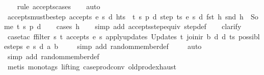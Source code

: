\begin{isabellebody}
%
\isadelimproof
\ \ %
\endisadelimproof
%
\isatagproof
{}\isamarkupfalse%
\ {\isacharparenleft}rule\ accepts{\isachardot}cases{\isacharparenright}\isanewline
\ \ \isamarkupfalse%
\ auto%
\endisatagproof
{\isafoldproof}%
%
\isadelimproof
\isanewline
%
\endisadelimproof
\isanewline
{}\isamarkupfalse%
\ accepts{\isacharunderscore}must{\isacharunderscore}be{\isacharunderscore}step{\isacharcolon}\ {\isachardoublequoteopen}accepts\ e\ s\ d\ {\isacharparenleft}h{\isacharhash}ts{\isacharparenright}\ {\isasymLongrightarrow}\ {\isasymexists}t\ s{\isacharprime}\ p\ d{\isacharprime}{\isachardot}\ step\ ts\ e\ s\ d\ {\isacharparenleft}fst\ h{\isacharparenright}\ {\isacharparenleft}snd\ h{\isacharparenright}\ {\isacharequal}\ Some\ {\isacharparenleft}t{\isacharcomma}\ s{\isacharprime}{\isacharcomma}\ p{\isacharcomma}\ d{\isacharprime}{\isacharparenright}{\isachardoublequoteclose}\isanewline
%
\isadelimproof
\ \ %
\endisadelimproof
%
\isatagproof
{}\isamarkupfalse%
\ {\isacharparenleft}cases\ h{\isacharparenright}\isanewline
\ \ \isamarkupfalse%
\ {\isacharparenleft}simp\ add{\isacharcolon}\ accepts{\isacharunderscore}step{\isacharunderscore}equiv\ step{\isacharunderscore}def{\isacharparenright}\isanewline
\ \ \isamarkupfalse%
\ clarify\isanewline
\ \ \isamarkupfalse%
\ {\isacharparenleft}case{\isacharunderscore}tac\ {\isachardoublequoteopen}{\isacharparenleft}ffilter\ {\isacharparenleft}{\isasymlambda}{\isacharparenleft}s{\isacharprime}{\isacharcomma}\ t{\isacharparenright}{\isachardot}\ accepts\ e\ s{\isacharprime}\ {\isacharparenleft}apply{\isacharunderscore}updates\ {\isacharparenleft}Updates\ t{\isacharparenright}\ {\isacharparenleft}join{\isacharunderscore}ir\ b\ d{\isacharparenright}\ d{\isacharparenright}\ ts{\isacharparenright}\ {\isacharparenleft}possible{\isacharunderscore}steps\ e\ s\ d\ a\ b{\isacharparenright}{\isacharparenright}{\isachardoublequoteclose}{\isacharparenright}\isanewline
\ \ \ \isamarkupfalse%
\ {\isacharparenleft}simp\ add{\isacharcolon}\ random{\isacharunderscore}member{\isacharunderscore}def{\isacharparenright}\isanewline
\ \ \ \isamarkupfalse%
\ auto{\isacharbrackleft}{}{\isacharbrackright}\isanewline
\ \ \isamarkupfalse%
\ {\isacharparenleft}simp\ add{\isacharcolon}\ random{\isacharunderscore}member{\isacharunderscore}def{\isacharparenright}\isanewline
\ \ \isamarkupfalse%
\ {\isacharparenleft}metis\ {\isacharparenleft}mono{\isacharunderscore}tags{\isacharcomma}\ lifting{\isacharparenright}\ case{\isacharunderscore}prod{\isacharunderscore}conv\ old{\isachardot}prod{\isachardot}exhaust{\isacharparenright}%

\end{isabellebody}
